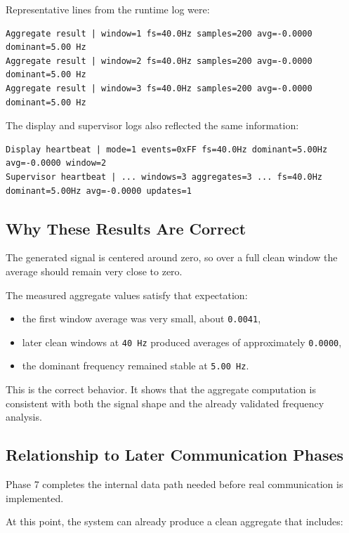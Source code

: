 \documentclass[12pt,a4paper]{article}
\begin{document}
Representative lines from the runtime log were:

\begin{lstlisting}
Aggregate result | window=1 fs=40.0Hz samples=200 avg=-0.0000 dominant=5.00 Hz
Aggregate result | window=2 fs=40.0Hz samples=200 avg=-0.0000 dominant=5.00 Hz
Aggregate result | window=3 fs=40.0Hz samples=200 avg=-0.0000 dominant=5.00 Hz
\end{lstlisting}

The display and supervisor logs also reflected the same information:

\begin{lstlisting}
Display heartbeat | mode=1 events=0xFF fs=40.0Hz dominant=5.00Hz avg=-0.0000 window=2
Supervisor heartbeat | ... windows=3 aggregates=3 ... fs=40.0Hz dominant=5.00Hz avg=-0.0000 updates=1
\end{lstlisting}

\subsection{Why These Results Are Correct}

The generated signal is centered around zero, so over a full clean window the
average should remain very close to zero.

The measured aggregate values satisfy that expectation:

\begin{itemize}
    \item the first window average was very small, about \texttt{0.0041},
    \item later clean windows at \texttt{40 Hz} produced averages of
    approximately \texttt{0.0000},
    \item the dominant frequency remained stable at \texttt{5.00 Hz}.
\end{itemize}

This is the correct behavior. It shows that the aggregate computation is
consistent with both the signal shape and the already validated frequency
analysis.

\subsection{Relationship to Later Communication Phases}

Phase 7 completes the internal data path needed before real communication is
implemented.

At this point, the system can already produce a clean aggregate that includes:
\end{document}

